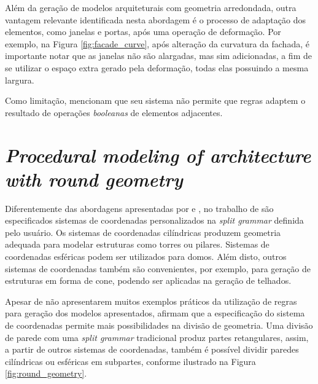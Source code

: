 Além da geração de modelos arquiteturais com geometria arredondada, outra vantagem relevante identificada nesta abordagem é o processo de adaptação dos elementos, como janelas e portas, após uma operação de deformação. Por exemplo, na Figura \ref{fig:facade_curve}, após alteração da curvatura da fachada, é importante notar que as janelas não são alargadas, mas sim adicionadas, a fim de se utilizar o espaço extra gerado pela deformação, todas elas possuindo a mesma largura.

Como limitação,  mencionam que seu sistema não permite que regras adaptem o resultado de operações \textit{booleanas} de elementos adjacentes.

\newpage
\clearpage

\section{\textit{Procedural modeling of architecture with round geometry}}
\label{sec:paper_edelsbrunner2017} %

Diferentemente das abordagens apresentadas por  e , no trabalho de  são especificados sistemas de coordenadas personalizados na \textit{split grammar} definida pelo usuário. Os sistemas de coordenadas cilíndricas produzem geometria adequada para modelar estruturas como torres ou pilares. Sistemas de coordenadas esféricas podem ser utilizados para domos. Além disto, outros sistemas de coordenadas também são convenientes, por exemplo, para geração de estruturas em forma de cone, podendo ser aplicadas na geração de telhados.

Apesar de não apresentarem muitos exemplos práticos da utilização de regras para geração dos modelos apresentados,  afirmam que a especificação do sistema de coordenadas permite mais possibilidades na divisão de geometria. Uma divisão de parede com uma \textit{split grammar} tradicional produz partes retangulares, assim, a partir de outros sistemas de coordenadas, também é possível dividir paredes cilíndricas ou esféricas em subpartes, conforme ilustrado na Figura \ref{fig:round_geometry}.

\begin{figure}[h!]
	\centering
	\captionsetup{width=15cm}
	{}	
\end{figure}

